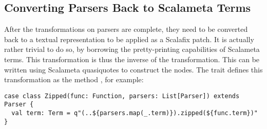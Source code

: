 \documentclass[../../main.tex]{subfiles}
\begin{document}
\subsection{Converting Parsers Back to Scalameta Terms}
After the transformations on parsers are complete, they need to be converted back to a textual representation to be applied as a Scalafix patch.
It is actually rather trivial to do so, by borrowing the pretty-printing capabilities of Scalameta terms.
This transformation is thus the inverse of the  transformation.
This can be written using Scalameta quasiquotes to construct the  nodes.
The  trait defines this transformation as the method , for example:
\begin{verbatim}
case class Zipped(func: Function, parsers: List[Parser]) extends Parser {
  val term: Term = q"(..${parsers.map(_.term)}).zipped(${func.term})"
}
\end{verbatim}
\end{document}
